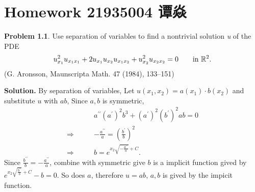 \documentclass[a4paper]{book}
\makeatletter
\newenvironment{solution}%
{\noindent\textbf{Solution.}}%
{\qedhere}
\newcommand{\voidenvironment}[1]{%
  \expandafter\providecommand\csname env@#1@save@env\endcsname{}%
  \expandafter\providecommand\csname env@#1@process\endcsname{}%
  \@ifundefined{#1}{}{\RenewEnviron{#1}{}}%
}
\numberwithin{equation}{chapter}
\theoremstyle{definition}
\newtheorem{pro}[exm]{Problem}
\makeatother
\begin{document}
\pagestyle{empty}
% 



\setcounter{chapter}{8}




\chapter{Homework 21935004 谭焱}
% 


\begin{pro}
  Use separation of variables to find a nontrivial solution \textit{u} of the PDE
  \[u_{x_1}^2 u_{x_1 x_1} + 2 u_{x_1} u_{x_2} u_{x_1 x_2} + u_{x_2}^2 u_{x_2 x_2} = 0 \qquad \textmd{in } \mathbb{R}^2.\]
  (G. Aronsson, Maunscripta Math. 47 (1984), 133--151)
\end{pro}

\begin{solution}
  By separation of variables, Let $u(x_1,x_2) = a(x_1) \cdot b(x_2)$ and substitute $u$ with $ab$, Since $a,b$ is symmetric,
  \begin{align*}
    &a^{\prime \prime} (a^\prime)^2 b^3 + (a^\prime)^2(b^\prime)^2 ab = 0 \\
    \Longrightarrow\qquad & - \frac{a^{\prime \prime}}{a} = \left( \frac{b^\prime}{b} \right)^2 \\
    \Longrightarrow\qquad & b = e^{x_2\sqrt{-\frac{a^{\prime\prime}}{a}} + C}.
  \end{align*}
  Since $\frac{b^{\prime\prime}}{b} = - \frac{a^{\prime\prime}}{a}$, combine with symmetric give $b$ is a implicit function gived by $e^{x_2\sqrt{\frac{b^{\prime\prime}}{b}} + C} - b = 0$. So does $a$, therefore $u = ab$, $a,b$ is gived by the impicit function.
\end{solution}
\end{document}
